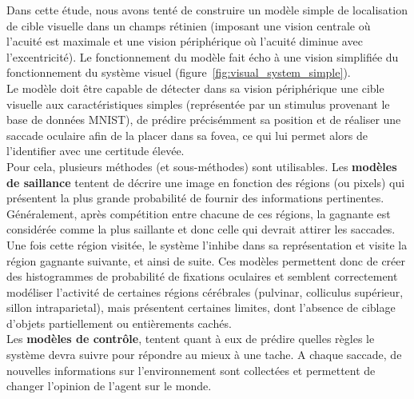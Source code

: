 Dans cette étude, nous avons tenté de construire un modèle simple de localisation de cible visuelle dans un champs rétinien (imposant une vision centrale où l'acuité est maximale et une vision périphérique où l'acuité diminue avec l'excentricité). Le fonctionnement du modèle fait écho à une vision simplifiée du fonctionnement du système visuel (figure~\ref{fig:visual_system_simple})\autocite{Zhaoping2014}.\\
Le modèle doit être capable de détecter dans sa vision périphérique une cible visuelle aux caractéristiques simples (représentée par un stimulus provenant le base de données MNIST), de prédire précisémment sa position et de réaliser une saccade oculaire afin de la placer dans sa fovea, ce qui lui permet alors de l'identifier avec une certitude élevée.\\
Pour cela, plusieurs méthodes (et sous-méthodes) sont utilisables.
Les \textbf{modèles de saillance} tentent de décrire une image en fonction des régions (ou pixels) qui présentent la plus grande probabilité de fournir des informations pertinentes. Généralement, après compétition entre chacune de ces régions, la gagnante est considérée comme la plus saillante et donc celle qui devrait attirer les saccades. Une fois cette région visitée, le système l'inhibe dans sa représentation et visite la région gagnante suivante, et ainsi de suite. Ces modèles permettent donc de créer des histogrammes de probabilité de fixations oculaires et semblent correctement modéliser l'activité de certaines régions cérébrales (pulvinar, colliculus supérieur, sillon intraparietal), mais présentent certaines limites, dont l'absence de ciblage d'objets partiellement ou entièrements cachés\autocite{Butko2010, Itti2000}.\\
Les \textbf{modèles de contrôle}, tentent quant à eux de prédire quelles règles le système devra suivre pour répondre au mieux à une tache. A chaque saccade, de nouvelles informations sur l'environnement sont collectées et permettent de changer l'opinion de l'agent sur le monde\autocite{Butko2010}.
